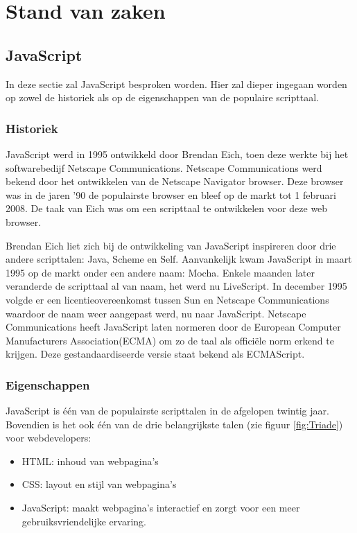 \chapter{Stand van zaken}
\label{ch:stand-van-zaken}



\section{JavaScript}
In deze sectie zal JavaScript besproken worden. Hier zal dieper ingegaan worden op zowel de historiek als op de eigenschappen van de populaire scripttaal.

\subsection{Historiek}
JavaScript werd in 1995 ontwikkeld door Brendan Eich, toen deze werkte bij het softwarebedijf Netscape Communications. Netscape Communications werd bekend door het ontwikkelen van de Netscape Navigator browser. Deze browser was in de jaren '90 de populairste browser en bleef op de markt tot 1 februari 2008. De taak van Eich was om een scripttaal te ontwikkelen voor deze web browser. 

Brendan Eich liet zich bij de ontwikkeling van JavaScript inspireren door drie andere scripttalen: Java, Scheme en Self. Aanvankelijk kwam JavaScript in maart 1995 op de markt onder een andere naam: Mocha. Enkele maanden later veranderde de scripttaal al van naam, het werd nu LiveScript. In december 1995 volgde er een licentieovereenkomst tussen Sun en Netscape Communications waardoor de naam weer aangepast werd, nu naar JavaScript.
Netscape Communications heeft JavaScript laten normeren door de European Computer Manufacturers Association(ECMA) om zo de taal als officiële norm erkend te krijgen. 
Deze gestandaardiseerde versie staat bekend als ECMAScript.

\subsection{Eigenschappen}
JavaScript is één van de populairste scripttalen in de afgelopen twintig jaar.
Bovendien is het ook één van de drie belangrijkste talen (zie figuur \ref{fig:Triade}) voor webdevelopers:
\begin{itemize}
\item HTML: inhoud van webpagina's
\item CSS: layout en stijl van webpagina's
\item JavaScript: maakt webpagina's interactief en zorgt voor een meer gebruiksvriendelijke ervaring.

\end{itemize}
\graphicspath{{./img/}}

